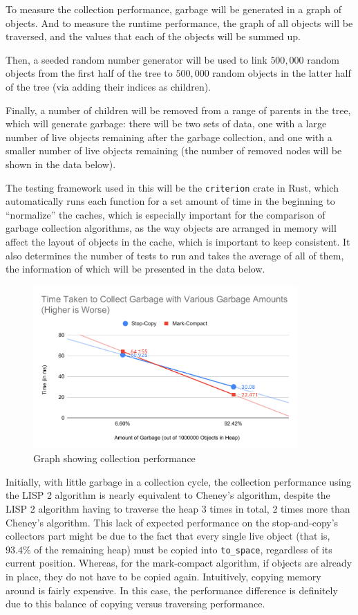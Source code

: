 \documentclass[index]{subfiles}
\begin{document}
To measure the collection performance, garbage will be generated in a graph of objects. And to measure the runtime performance, the graph of all objects will be traversed, and the values that each of the objects will be summed up.


Then, a seeded random number generator will be used to link \(500,000\) random objects from the first half of the tree to \(500,000\) random objects in the latter half of the tree (via adding their indices as children).

Finally, a number of children will be removed from a range of parents in the tree, which will generate garbage: there will be two sets of data, one with a large number of live objects remaining after the garbage collection, and one with a smaller number of live objects remaining (the number of removed nodes will be shown in the data below).

The testing framework used in this will be the \verb+criterion+ crate in Rust, which automatically runs each function for a set amount of time in the beginning to ``normalize'' the caches, which is especially important \cite{a_unified_theory_of_garbage_collection} for the comparison of garbage collection algorithms, as the way objects are arranged in memory will affect the layout of objects in the cache, which is important to keep consistent. It also determines the number of tests to run and takes the average of all of them, the information of which will be presented in the data below.

\begin{figure}[H]
    \centering
    \includegraphics[width=0.9\textwidth]{pics/collect-perf.pdf}
    \caption{Graph showing collection performance}
\end{figure}

Initially, with little garbage in a collection cycle, the collection performance using the LISP 2 algorithm is nearly equivalent to Cheney's algorithm, despite the LISP 2 algorithm having to traverse the heap 3 times in total, 2 times more than Cheney's algorithm. This lack of expected performance on the stop-and-copy's collectors part might be due to the fact that every single live object (that is, \(93.4\%\) of the remaining heap) must be copied into \verb+to_space+, regardless of its current position. Whereas, for the mark-compact algorithm, if objects are already in place, they do not have to be copied again. Intuitively, copying memory around is fairly expensive. In this case, the performance difference is definitely due to this balance of copying versus traversing performance.
\end{document}
